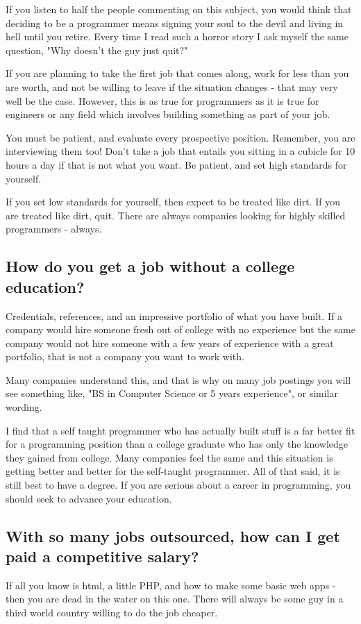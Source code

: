 \documentclass[a4paper,12pt]{article}
\begin{document}
If you listen to half the people commenting on this subject, you would think that deciding to be a programmer means signing your soul to the devil and living in hell until you retire. Every time I read such a horror story I ask myself the same question, "Why doesn't the guy just quit?"

If you are planning to take the first job that comes along, work for less than you are worth, and not be willing to leave if the situation changes - that may very well be the case. However, this is as true for programmers as it is true for engineers or any field which involves building something as part of your job.

You must be patient, and evaluate every prospective position. Remember, you are interviewing them too! Don't take a job that entails you sitting in a cubicle for 10 hours a day if that is not what you want. Be patient, and set high standards for yourself.

If you set low standards for yourself, then expect to be treated like dirt. If you are treated like dirt, quit. There are always companies looking for highly skilled programmers - always.
\subsection{How do you get a job without a college education?}
Credentials, references, and an impressive portfolio of what you have built. If a company would hire someone fresh out of college with no experience but the same company would not hire someone with a few years of experience with a great portfolio, that is not a company you want to work with.

Many companies understand this, and that is why on many job postings you will see something like, "BS in Computer Science or 5 years experience", or similar wording.

I find that a self taught programmer who has actually built stuff is a far better fit for a programming position than a college graduate who has only the knowledge they gained from college. Many companies feel the same and this situation is getting better and better for the self-taught programmer. All of that said, it is still best to have a degree. If you are serious about a career in programming, you should seek to advance your education.
\subsection{With so many jobs outsourced, how can I get paid a competitive salary?}
If all you know is html, a little PHP, and how to make some basic web apps - then you are dead in the water on this one. There will always be some guy in a third world country willing to do the job cheaper.
\end{document}
